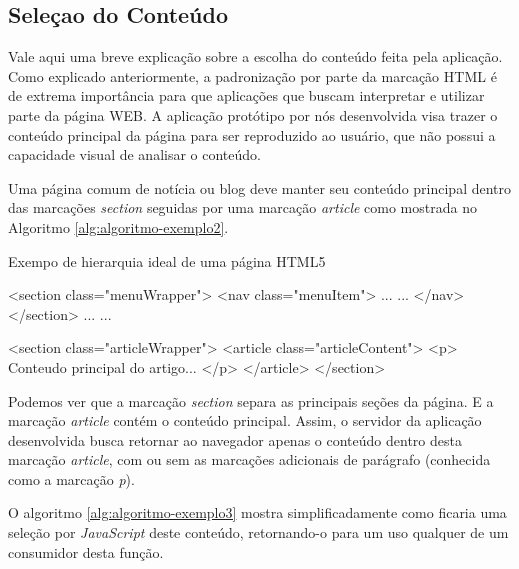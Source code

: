 \documentclass[
	12pt,				%
	oneside,			%
	a4paper,			%
	english,			%
	brazil				%
	]{abntex2ppgsi}
\begin{document}
\subsection{Seleçao do Conteúdo} \label{sec:selecao-conteudo}

Vale aqui uma breve explicação sobre a escolha do conteúdo feita pela aplicação. Como explicado anteriormente, a padronização por parte da marcação HTML é de extrema importância para que aplicações que buscam interpretar e utilizar parte da página WEB. A aplicação protótipo por nós desenvolvida visa trazer o conteúdo principal da página para ser reproduzido ao usuário, que não possui a capacidade visual de analisar o conteúdo.

Uma página comum de notícia ou blog deve manter seu conteúdo principal dentro das marcações \textit{section} seguidas por uma marcação \textit{article} como mostrada no Algoritmo \ref{alg:algoritmo-exemplo2}. 

\begin{algorithm}[htbp]
	\caption{Exempo de hierarquia ideal de uma página HTML5}
	\label{alg:algoritmo-exemplo2}
	\begin{algorithmic}
	\State \textless section class="menuWrapper"\textgreater
		\State \textless nav class="menuItem"\textgreater
		\State ... 
		\State ...
	\State	\textless/nav\textgreater
	\State \textless/section\textgreater
	\State ...
	\State ...
	
	\State \textless section class="articleWrapper"\textgreater
	\State 		\textless article class="articleContent"\textgreater
	\State 			\textless p\textgreater
	\State 				Conteudo principal do artigo...
		\State		\textless/p\textgreater
	\State		\textless/article\textgreater
	\State \textless/section\textgreater

	\end{algorithmic}
\end{algorithm}

Podemos ver que a marcação \textit{section} separa as principais seções da página. E a marcação \textit{article} contém o conteúdo principal. Assim, o servidor da aplicação desenvolvida busca retornar ao navegador apenas o conteúdo dentro desta marcação \textit{article}, com ou sem as marcações adicionais de parágrafo (conhecida como a marcação \textit{p}).
 
O algoritmo \ref{alg:algoritmo-exemplo3} mostra simplificadamente como ficaria uma seleção por \textit{JavaScript} deste conteúdo, retornando-o para um uso qualquer de um consumidor desta função.
\end{document}
